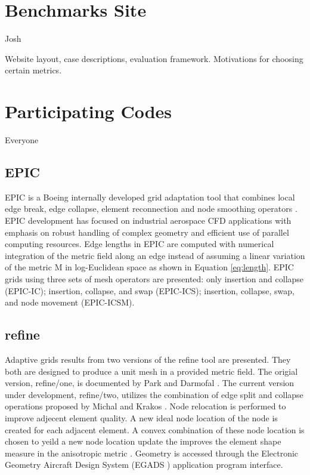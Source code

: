 \documentclass[3p,times,procedia,number]{elsarticle}
\begin{document}
\section{Benchmarks Site}
{\color{red} Josh}

Website layout, case descriptions, evaluation framework.
Motivations for choosing certain metrics.

\section{Participating Codes}
{\color{red} Everyone}

\subsection{EPIC}

EPIC is a Boeing internally developed grid adaptation tool that combines 
local edge break, edge collapse, element reconnection and node smoothing 
operators \cite{michal-krakos-aniso-adapt-edge}.
EPIC development has focused on industrial aerospace CFD 
applications with emphasis on robust handling of complex geometry and 
efficient use of parallel computing resources. Edge lengths in EPIC are 
computed with numerical integration of the metric field along an edge 
instead of assuming a linear variation of the metric M in log-Euclidean space 
as shown in Equation \ref{eq:length}.
EPIC grids using three sets of mesh operators are presented: 
only insertion and collapse (EPIC-IC); insertion, collapse, and swap (EPIC-ICS); 
insertion, collapse, swap, and node movement (EPIC-ICSM).  

\subsection{refine}

Adaptive grids results from two versions of the refine tool are presented.
They both are designed to produce a
unit mesh \cite{loseille-alauzet-siamjna-2011-cont-mesh-framework-1}
in a provided metric field.
The origial version, refine/one, is documented
by Park and Darmofal \cite{park-darmofal-parallel-aniso-adapt-aiaa}.
The current version under development, refine/two,
utilizes the combination of edge split and collapse operations
proposed by Michal and Krakos \cite{michal-krakos-aniso-adapt-edge}.
Node relocation is performed to improve adjecent element quality.
A new ideal node location of the node is created
for each adjacent element.
A convex combination of these node location is chosen
to yeild a new node location update the improves
the element shape measure in the anisotropic
metric \cite{alauzet-topology-moving-mesh}.
Geometry is accessed through the
Electronic Geometry Aircraft Design System
(EGADS \cite{haimes-drela-egads})
application program interface.
\end{document}
